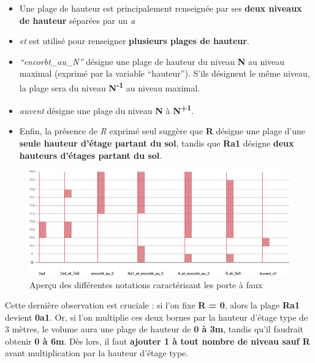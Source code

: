 \documentclass[
  11pt,
  french,
]{article}
\providecommand{\tightlist}{%
  \setlength{\itemsep}{0pt}\setlength{\parskip}{0pt}}
\begin{document}
\begin{itemize}
\tightlist
\item
  Une plage de hauteur est principalement renseignée par ses
  \textbf{deux niveaux de hauteur} séparées par un \emph{a}
\item
  \emph{\emph{et}} est utilisé pour renseigner \textbf{plusieurs plages
  de hauteur}.
\item
  \emph{``encorbt\_au\_N''} désigne une plage de hauteur du niveau
  \textbf{N} au niveau maximal (exprimé par la variable ``hauteur'').
  S'ils désignent le même niveau, la plage sera du niveau
  \textbf{N\textsuperscript{-1}} au niveau maximal.
\item
  \emph{auvent} désigne une plage du niveau \textbf{N} à
  \textbf{N\textsuperscript{+1}}.
\item
  Enfin, la présence de \emph{R} exprimé seul suggère que \textbf{R}
  désigne une plage d'une \textbf{seule hauteur d'étage partant du sol},
  tandis que \textbf{Ra1} désigne \textbf{deux hauteurs d'étages partant
  du sol}.
\end{itemize}

\begin{tcolorbox}
\begin{figure}

{\centering \includegraphics[width=0.9\linewidth]{__imgs/hpaf} 

}

\caption[Aperçu des différentes notations caractérisant les porte à faux  -  Réalisation personnelle]{Aperçu des différentes notations caractérisant les porte à faux}\label{fig:hpaf}
\end{figure}
\end{tcolorbox}

Cette dernière observation est cruciale : si l'on fixe \textbf{R = 0},
alors la plage \textbf{Ra1} devient \textbf{0a1}. Or, si l'on multiplie
ces deux bornes par la hauteur d'étage type de 3 mètres, le volume aura
une plage de hauteur de \textbf{0 à 3m}, tandis qu'il faudrait obtenir
\textbf{0 à 6m}. Dès lors, il faut \textbf{ajouter 1 à tout nombre de
niveau sauf R} avant multiplication par la hauteur d'étage type.
\end{document}
